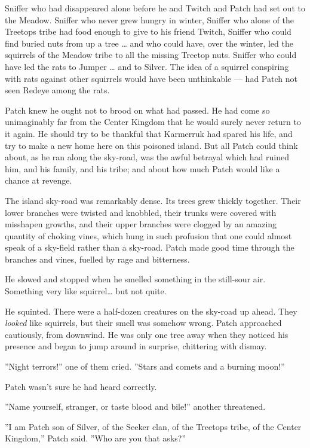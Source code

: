 \documentclass[12pt]{book}
\begin{document}
Sniffer who had disappeared alone before he and Twitch and Patch had set out to the Meadow. Sniffer who never grew hungry in winter, Sniffer who alone of the Treetops tribe had food enough to give to his friend Twitch, Sniffer who could find buried nuts from up a tree \ldots{}
and who could have, over the winter, led the squirrels of the Meadow tribe to all the missing Treetop nuts. Sniffer who could have led the rats to Jumper \ldots{}
and to Silver. The idea of a squirrel conspiring with rats against other squirrels would have been unthinkable ---
had Patch not seen Redeye among the rats.

Patch knew he ought not to brood on what had passed. He had come so unimaginably far from the Center Kingdom that he would surely never return to it again. He should try to be thankful that Karmerruk had spared his life, and try to make a new home here on this poisoned island. But all Patch could think about, as he ran along the sky-road, was the awful betrayal which had ruined him, and his family, and his tribe; and about how much Patch would like a chance at revenge.

The island sky-road was remarkably dense. Its trees grew thickly together. Their lower branches were twisted and knobbled, their trunks were covered with misshapen growths, and their upper branches were clogged by an amazing quantity of choking vines, which hung in such profusion that one could almost speak of a sky-field rather than a sky-road. Patch made good time through the branches and vines, fuelled by rage and bitterness.

He slowed and stopped when he smelled something in the still-sour air. Something very like squirrel\ldots{}
but not quite.

He squinted. There were a half-dozen creatures on the sky-road up ahead. They {\it looked} like squirrels, but their smell was somehow wrong. Patch approached cautiously, from downwind. He was only one tree away when they noticed his presence and began to jump around in surprise, chittering with dismay.

''Night terrors!'' one of them cried. ''Stars and comets and a burning moon!''

Patch wasn't sure he had heard correctly.

''Name yourself, stranger, or taste blood and bile!'' another threatened.

''I am Patch son of Silver, of the Seeker clan, of the Treetops tribe, of the Center Kingdom,'' Patch said. ''Who are you that asks?''
\end{document}
